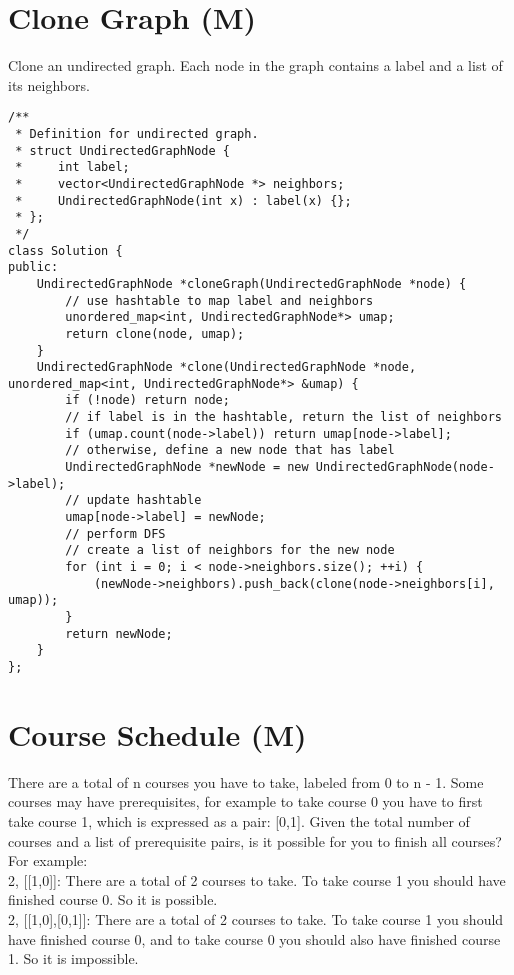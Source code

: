 \section{Clone Graph (M)}
Clone an undirected graph. Each node in the graph contains a label and a list of its neighbors. \\

\begin{lstlisting}
/**
 * Definition for undirected graph.
 * struct UndirectedGraphNode {
 *     int label;
 *     vector<UndirectedGraphNode *> neighbors;
 *     UndirectedGraphNode(int x) : label(x) {};
 * };
 */
class Solution {
public:
    UndirectedGraphNode *cloneGraph(UndirectedGraphNode *node) {
        // use hashtable to map label and neighbors
        unordered_map<int, UndirectedGraphNode*> umap;
        return clone(node, umap);
    }
    UndirectedGraphNode *clone(UndirectedGraphNode *node, unordered_map<int, UndirectedGraphNode*> &umap) {
        if (!node) return node;
        // if label is in the hashtable, return the list of neighbors
        if (umap.count(node->label)) return umap[node->label];
        // otherwise, define a new node that has label
        UndirectedGraphNode *newNode = new UndirectedGraphNode(node->label);
        // update hashtable
        umap[node->label] = newNode;
        // perform DFS
        // create a list of neighbors for the new node
        for (int i = 0; i < node->neighbors.size(); ++i) {
            (newNode->neighbors).push_back(clone(node->neighbors[i], umap));
        }
        return newNode;
    } 
};
\end{lstlisting}


\section{Course Schedule (M)}
There are a total of n courses you have to take, labeled from 0 to n - 1. Some courses may have prerequisites, for example to take course 0 you have to first take course 1, which is expressed as a pair: [0,1]. Given the total number of courses and a list of prerequisite pairs, is it possible for you to finish all courses? \\

For example:\\
2, [[1,0]]: There are a total of 2 courses to take. To take course 1 you should have finished course 0. So it is possible.\\
2, [[1,0],[0,1]]: There are a total of 2 courses to take. To take course 1 you should have finished course 0, and to take course 0 you should also have finished course 1. So it is impossible.\\

